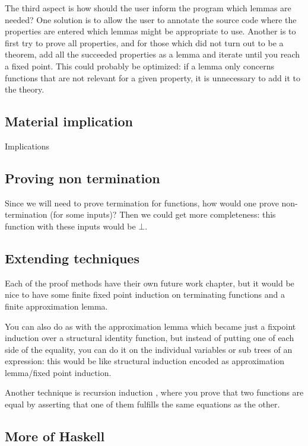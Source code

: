 The third aspect is how should the user inform the program which
lemmas are needed? One solution is to allow the user to annotate the
source code where the properties are entered which lemmas might be
appropriate to use. Another is to first try to prove all properties,
and for those which did not turn out to be a theorem, add all the
succeeded properties as a lemma and iterate until you reach a fixed
point. This could probably be optimized: if a lemma only concerns
functions that are not relevant for a given property, it is
unnecessary to add it to the theory.

\subsection{Material implication}

Implications

\subsection{Proving non termination}

Since we will need to prove termination for functions, how would one
prove non-termination (for some inputs)? Then we could get more
completeness: this function with these inputs would be $\bot$.

\subsection{Extending techniques}

Each of the proof methods have their own future work chapter, but it
would be nice to have some finite fixed point induction on terminating
functions and a finite approximation lemma.

You can also do as with the approximation lemma which became just a
fixpoint induction over a structural identity function, but instead of
putting one of each side of the equality, you can do it on the
individual variables or sub trees of an expression: this would be like
structural induction encoded as approximation lemma/fixed point induction.

Another technique is recursion induction \cite{recind}, where you
prove that two functions are equal by asserting that one of them
fulfills the same equations as the other.

\subsection{More of Haskell}

